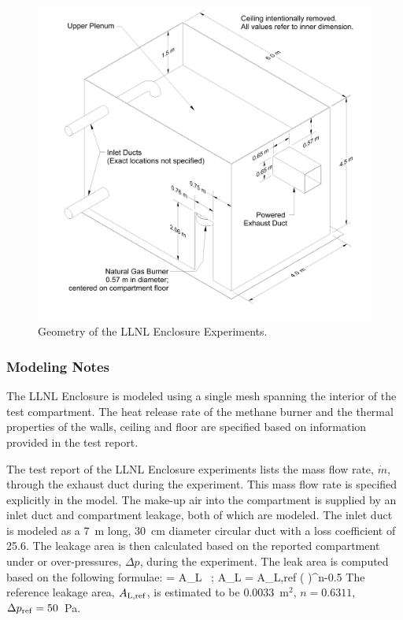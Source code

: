 \begin{figure}[p]
\includegraphics[width=\textwidth]{FIGURES/LLNL_Enclosure/LLNL_Enclosure_Drawing}
\caption[Geometry of the LLNL Enclosure Experiments]{Geometry of the LLNL Enclosure Experiments.}
\label{LLNL_Enclosure_Drawing}
\end{figure}

\subsubsection{Modeling Notes}

The LLNL Enclosure is modeled using a single mesh spanning the interior of the test compartment. The heat release rate of the methane burner and the thermal properties of the walls, ceiling and floor are specified based on information provided in the test report.

The test report of the LLNL Enclosure experiments lists the mass flow rate, $\dot{m}$, through the exhaust duct during the experiment. This mass flow rate is specified explicitly in the model. The make-up air into the compartment is supplied by an inlet duct and compartment leakage, both of which are modeled. The inlet duct is modeled as a 7~m long, 30~cm diameter circular duct with a loss coefficient of 25.6. The leakage area is then calculated based on the reported compartment under or over-pressures, $\Delta p$, during the experiment. The leak area is computed based on the following formulae:
\be
    = A_{\rm L} \,   \quad ; \quad A_{\rm L} = A_{\rm L,ref} \left(  \right)^{n-0.5}
\ee
The reference leakage area, $A_{\rm L,ref}$, is estimated to be 0.0033~m$^2$, $n=0.6311$, $\Delta p_{\rm ref}=50$~Pa.

